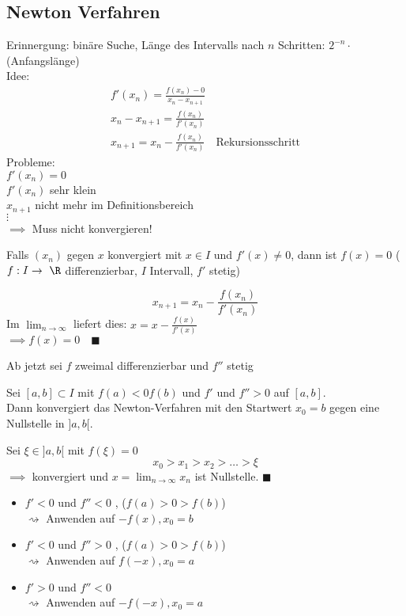 \subsection{Newton Verfahren}
Erinnergung: binäre Suche, Länge des Intervalls nach $n$ Schritten: $2^{-n} \cdot$ (Anfangslänge)\\
Idee:
\begin{gather*}
	f'(x_n) = \frac{f(x_n) - 0}{x_n - x_{n+1}} \\
	x_n - x_{n+1} = \frac{f(x_n)}{f'(x_n)} \\
	x_{n+1} = x_n - \frac{f(x_n)}{f'(x_n)} \quad \text{Rekursionsschritt}
\end{gather*}
Probleme: \\
$f'(x_n) = 0$ \\
$f'(x_n)$ sehr klein \\
$x_{n+1}$ nicht mehr im Definitionsbereich \\
$\vdots$ \\
$\implies$ Muss nicht konvergieren! \\
\begin{beh}
	Falls $(x_n)$ gegen $x$ konvergiert mit $x \in I$ und $f'(x) \neq 0$, dann ist $f(x) = 0$ ($f: I \rightarrow \R$ differenzierbar, $I$ Intervall, $f'$ stetig) \\
	\begin{bew}
		\[ x_{n+1} = x_n - \frac{f(x_n)}{f'(x_n)} \]
		Im $\lim_{n \rightarrow \infty}$ liefert dies: $x = x - \frac{f(x)}{f'(x)}$ \\
		$\implies f(x) = 0 \quad \blacksquare$
	\end{bew}
\end{beh}
Ab jetzt sei $f$ zweimal differenzierbar und $f''$ stetig \\
\begin{beh}
	Sei $[a,b] \subset I$ mit $f(a) < 0 f(b)$ und $f'$ und $f'' > 0$ auf $[a,b]$. \\
	Dann konvergiert das Newton-Verfahren mit den Startwert $x_0 = b$ gegen eine Nullstelle in $]a,b[$. \\
	\begin{bew}
		Sei $\xi \in ]a,b[$ mit $f(\xi) = 0$
		\[ x_0 > x_1 > x_2 > \dots > \xi \]
		$\implies$ konvergiert und $x = \lim_{n \rightarrow \infty} x_n$ ist Nullstelle. \quad $\blacksquare$
	\end{bew}
\end{beh}
\begin{itemize}
	\item $f' < 0$ und $f'' < 0$ , ($f(a) > 0 > f(b)$) \\
		$\rightsquigarrow$ Anwenden auf $-f(x) , x_0 = b$
	\item $f' < 0$ und $f'' > 0$ , ($f(a) > 0 > f(b)$) \\
		$\rightsquigarrow$ Anwenden auf $f(-x) , x_0 = a$
	\item $f' > 0$ und $f'' < 0$ \\
		$\rightsquigarrow$ Anwenden auf $-f(-x) , x_0 = a$
\end{itemize}
